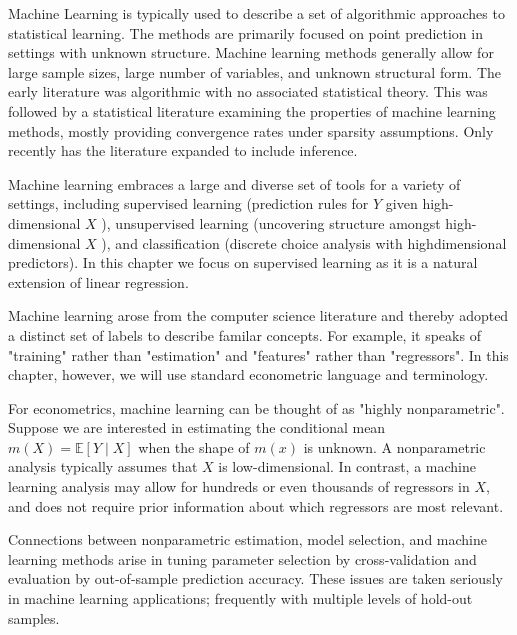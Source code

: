 \documentclass[10pt]{article}
\begin{document}
Machine Learning is typically used to describe a set of algorithmic approaches to statistical learning. The methods are primarily focused on point prediction in settings with unknown structure. Machine learning methods generally allow for large sample sizes, large number of variables, and unknown structural form. The early literature was algorithmic with no associated statistical theory. This was followed by a statistical literature examining the properties of machine learning methods, mostly providing convergence rates under sparsity assumptions. Only recently has the literature expanded to include inference.

Machine learning embraces a large and diverse set of tools for a variety of settings, including supervised learning (prediction rules for $Y$ given high-dimensional $X$ ), unsupervised learning (uncovering structure amongst high-dimensional $X$ ), and classification (discrete choice analysis with highdimensional predictors). In this chapter we focus on supervised learning as it is a natural extension of linear regression.

Machine learning arose from the computer science literature and thereby adopted a distinct set of labels to describe familar concepts. For example, it speaks of "training" rather than "estimation" and "features" rather than "regressors". In this chapter, however, we will use standard econometric language and terminology.

For econometrics, machine learning can be thought of as "highly nonparametric". Suppose we are interested in estimating the conditional mean $m(X)=\mathbb{E}[Y \mid X]$ when the shape of $m(x)$ is unknown. A nonparametric analysis typically assumes that $X$ is low-dimensional. In contrast, a machine learning analysis may allow for hundreds or even thousands of regressors in $X$, and does not require prior information about which regressors are most relevant.

Connections between nonparametric estimation, model selection, and machine learning methods arise in tuning parameter selection by cross-validation and evaluation by out-of-sample prediction accuracy. These issues are taken seriously in machine learning applications; frequently with multiple levels of hold-out samples.
\end{document}
